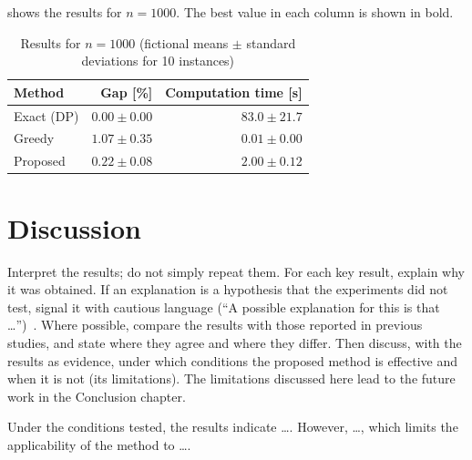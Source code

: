  shows the results for $n = 1000$. The best value in each column is shown in bold.

\begin{table}[htbp]
  \centering
  \caption[Results for $n = 1000$ (fictional data)]{Results for $n = 1000$ (fictional means $\pm$ standard deviations for 10 instances)}
  \label{tab:results}
  \begin{tabular}{lrr}
    \toprule
    Method & Gap [\%] & Computation time [s] \\
    \midrule
    Exact (DP) & $\mathbf{0.00 \pm 0.00}$ & $83.0 \pm 21.7$ \\
    Greedy     & $1.07 \pm 0.35$ & $\mathbf{0.01 \pm 0.00}$ \\
    Proposed   & $0.22 \pm 0.08$ & $2.00 \pm 0.12$ \\
    \bottomrule
  \end{tabular}
\end{table}

\section{Discussion}
\label{sec:discussion}

\begin{writingnote}
Interpret the results; do not simply repeat them.
For each key result, explain why it was obtained.
If an explanation is a hypothesis that the experiments did not test, signal it with cautious language
(``A possible explanation for this is that \ldots'')~\cite{morleyphrasebank}.
Where possible, compare the results with those reported in previous studies, and state where they agree and where they differ.
Then discuss, with the results as evidence, under which conditions the proposed method is effective
and when it is not (its limitations).
The limitations discussed here lead to the future work in the Conclusion chapter.
\end{writingnote}

Under the conditions tested, the results indicate \ldots.
However, \ldots, which limits the applicability of the method to \ldots.
